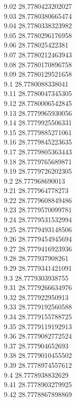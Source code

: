 {9.02	28.7780423202027\\
9.03	28.7780380665474\\
9.04	28.7780338323982\\
9.05	28.7780296176958\\
9.06	28.778025422381\\
9.07	28.7780212463943\\
9.08	28.7780170896758\\
9.09	28.7780129521658\\
9.1	28.7780088338041\\
9.11	28.7780047345305\\
9.12	28.7780006542845\\
9.13	28.7779965930056\\
9.14	28.7779925506331\\
9.15	28.7779885271061\\
9.16	28.7779845223635\\
9.17	28.7779805363443\\
9.18	28.7779765689871\\
9.19	28.7779726202305\\
9.2	28.777968690013\\
9.21	28.777964778273\\
9.22	28.7779608849486\\
9.23	28.7779570099781\\
9.24	28.7779531532994\\
9.25	28.7779493148506\\
9.26	28.7779454945694\\
9.27	28.7779416923936\\
9.28	28.777937908261\\
9.29	28.7779341421091\\
9.3	28.7779303938755\\
9.31	28.7779266634976\\
9.32	28.777922950913\\
9.33	28.7779192560588\\
9.34	28.7779155788725\\
9.35	28.7779119192913\\
9.36	28.7779082772524\\
9.37	28.777904652693\\
9.38	28.7779010455502\\
9.39	28.7778974557612\\
9.4	28.7778938832629\\
9.41	28.7778903279925\\
9.42	28.7778867898869\\
}
